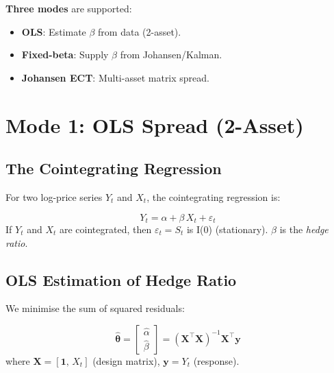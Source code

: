 \documentclass[10pt,a4paper,twocolumn]{article}
\begin{document}
\noindent\textbf{Three modes} are supported:
\begin{itemize}\setlength\itemsep{1pt}
  \item \textbf{OLS}: Estimate $\beta$ from data (2-asset).
  \item \textbf{Fixed-beta}: Supply $\beta$ from Johansen/Kalman.
  \item \textbf{Johansen ECT}: Multi-asset matrix spread.
\end{itemize}

\section{Mode 1: OLS Spread (2-Asset)}

\subsection{The Cointegrating Regression}

For two log-price series $Y_t$ and $X_t$, the cointegrating regression is:
\begin{tcolorbox}[mathbox={Formula 1 --- Cointegrating Regression}]
\vspace{-4pt}
\begin{equation}\label{eq:coint_reg}
  Y_t = \alpha + \beta\,X_t + \varepsilon_t
\end{equation}
\vspace{-3pt}
If $Y_t$ and $X_t$ are cointegrated, then $\varepsilon_t = S_t$ is I(0)
(stationary).  $\beta$ is the \emph{hedge ratio}.
\end{tcolorbox}

\subsection{OLS Estimation of Hedge Ratio}

We minimise the sum of squared residuals:
\begin{tcolorbox}[mathbox={Formula 2 --- OLS in Matrix Form}]
\vspace{-4pt}
\begin{equation}
  \hat{\boldsymbol\theta} =
    \begin{bmatrix}\hat\alpha\\\hat\beta\end{bmatrix}
    = (\mathbf{X}^\top\mathbf{X})^{-1}\mathbf{X}^\top\mathbf{y}
\end{equation}
where $\mathbf{X} = [\mathbf{1},\, X_t]$ (design matrix),\;
$\mathbf{y} = Y_t$ (response).
\vspace{-2pt}
\end{tcolorbox}
\end{document}
